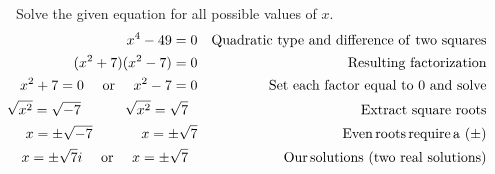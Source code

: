 \begin{example}~~~Solve the given equation for all possible values of $x$.
  \begin{eqnarray*}
   x^4-49 = 0 &  & \operatorname{Quadratic~type~and~difference~of~two~squares}\\
   (x^2+7)(x^2-7)=0 &  & \text{Resulting~factorization}  \\
	 x^2+7=0 \text{~~~~or~~~~} x^2-7=0 &  & \text{Set~each~factor~equal~to~}0 \text{~and~solve} \\
\sqrt{x^2} = \sqrt{-7}~~~~~ \,\ \,\ \,\ \sqrt{x^2} = \sqrt{7}~~ &  & \operatorname{Extract~square~roots} \\
		x= \pm{\sqrt{-7}}~~~~~~ \,\ \,\ \,\ x= \pm{\sqrt{7}} &  & \operatorname{Even} \operatorname{roots} \operatorname{require} \operatorname{a~} (\pm) \\
		x= \pm{\sqrt{7}i}~~~~ \text{or~~~~}   x=\pm{\sqrt{7}}~~ &  & \operatorname{Our} \operatorname{solutions~(two~real~solutions)}
	\end{eqnarray*}
\end{example}